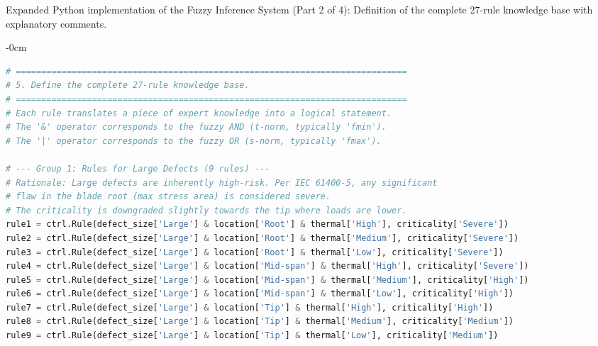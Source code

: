 \documentclass[energies,supfile,submit,pdftex,moreauthors]{Definitions/mdpi}
\begin{document}
\begin{listing}[H]
\caption{Expanded Python implementation of the Fuzzy Inference System (Part 2 of 4): Definition of the complete 27-rule knowledge base with explanatory comments.}
\label{lst:scikit-code-part2}
\begin{adjustwidth}{-\extralength}{0cm}
\begin{lstlisting}[language=Python, style=mystyle]
# =============================================================================
# 5. Define the complete 27-rule knowledge base.
# =============================================================================
# Each rule translates a piece of expert knowledge into a logical statement.
# The '&' operator corresponds to the fuzzy AND (t-norm, typically 'fmin').
# The '|' operator corresponds to the fuzzy OR (s-norm, typically 'fmax').

# --- Group 1: Rules for Large Defects (9 rules) ---
# Rationale: Large defects are inherently high-risk. Per IEC 61400-5, any significant
# flaw in the blade root (max stress area) is considered severe.
# The criticality is downgraded slightly towards the tip where loads are lower.
rule1 = ctrl.Rule(defect_size['Large'] & location['Root'] & thermal['High'], criticality['Severe'])
rule2 = ctrl.Rule(defect_size['Large'] & location['Root'] & thermal['Medium'], criticality['Severe'])
rule3 = ctrl.Rule(defect_size['Large'] & location['Root'] & thermal['Low'], criticality['Severe'])
rule4 = ctrl.Rule(defect_size['Large'] & location['Mid-span'] & thermal['High'], criticality['Severe'])
rule5 = ctrl.Rule(defect_size['Large'] & location['Mid-span'] & thermal['Medium'], criticality['High'])
rule6 = ctrl.Rule(defect_size['Large'] & location['Mid-span'] & thermal['Low'], criticality['High'])
rule7 = ctrl.Rule(defect_size['Large'] & location['Tip'] & thermal['High'], criticality['High'])
rule8 = ctrl.Rule(defect_size['Large'] & location['Tip'] & thermal['Medium'], criticality['Medium'])
rule9 = ctrl.Rule(defect_size['Large'] & location['Tip'] & thermal['Low'], criticality['Medium'])


\end{lstlisting}
\end{adjustwidth}
\end{listing}
\end{document}
